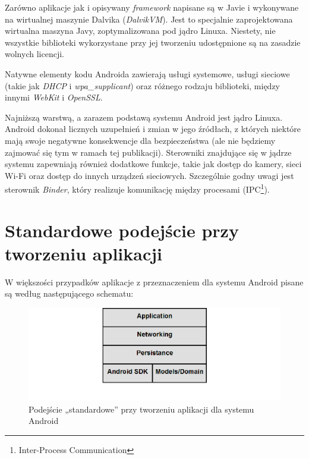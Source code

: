 Zarówno aplikacje jak i opisywany \textit{framework} napisane są w Javie i wykonywane na wirtualnej maszynie Dalvika (\textit{DalvikVM}). Jest to specjalnie zaprojektowana wirtualna maszyna Javy, zoptymalizowana pod jądro Linuxa. Niestety, nie wszystkie biblioteki wykorzystane przy jej tworzeniu udostępnione są na zasadzie wolnych licencji.

Natywne elementy kodu Androida zawierają usługi systemowe, usługi sieciowe (takie jak \textit{DHCP} i \textit{wpa\_supplicant}) oraz różnego rodzaju biblioteki, między innymi \textit{WebKit} i \textit{OpenSSL}. 

Najniższą warstwą, a zarazem podstawą systemu Android jest jądro Linuxa. Android dokonał licznych uzupełnień i zmian w jego źródłach, z których niektóre mają swoje negatywne konsekwencje dla bezpieczeństwa (ale nie będziemy zajmować się tym w ramach tej publikacji). Sterowniki znajdujące się w jądrze systemu zapewniają również dodatkowe funkcje, takie jak dostęp do kamery, sieci Wi-Fi oraz dostęp do innych urządzeń sieciowych. Szczególnie godny uwagi jest sterownik \textit{Binder}, który realizuje komunikację między procesami\cite{bib:hacker:handbook} (IPC\footnote{Inter-Process Communication}).

\section{Standardowe podejście przy tworzeniu aplikacji}
W większości przypadków aplikacje z przeznaczeniem dla systemu Android pisane są według następującego schematu:

\begin{figure}[!htb]
    \centering
    \includegraphics[width=15cm]{imgs/ch3_opis_problemu_1.png}
    \caption
{Podejście „standardowe” przy tworzeniu aplikacji dla systemu Android}
    \label{fig:opis_problemu}
\end{figure} 

